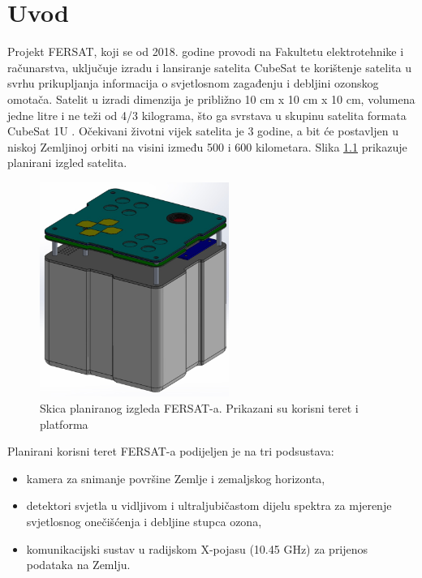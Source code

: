 \chapter{Uvod}
    Projekt FERSAT, koji se od 2018. godine provodi na Fakultetu elektrotehnike i računarstva, uključuje izradu i lansiranje satelita CubeSat te korištenje satelita u svrhu prikupljanja informacija o svjetlosnom zagađenju i debljini ozonskog omotača. Satelit u izradi dimenzija je približno 10 cm x 10 cm x 10 cm, volumena jedne litre i ne teži od 4/3 kilograma, što ga svrstava u skupinu satelita formata CubeSat 1U \cite{fersat_stranica_projekta}. Očekivani životni vijek satelita je 3 godine, a bit će postavljen u niskoj Zemljinoj orbiti na visini između 500 i 600 kilometara. Slika \ref{fig:fersat} prikazuje planirani izgled satelita.
    
    \begin{figure}[htb]
        \centering
        \includegraphics[height=7cm]{slike/fersat.png}
        \caption{Skica planiranog izgleda FERSAT-a. Prikazani su korisni teret  i platforma  \cite{fersat_stranica_projekta}}
        \label{fig:fersat}
    \end{figure}
    
    Planirani korisni teret  FERSAT-a podijeljen je na tri podsustava:

    \begin{itemize}
        \item kamera za snimanje površine Zemlje i zemaljskog horizonta,
        \item detektori svjetla u vidljivom i ultraljubičastom dijelu spektra za mjerenje svjetlosnog onečišćenja i debljine stupca ozona,
        \item komunikacijski sustav u radijskom X-pojasu (10.45 GHz) za prijenos podataka na Zemlju.
    \end{itemize}

